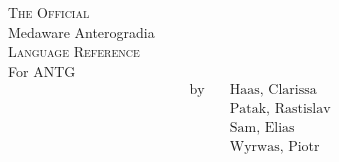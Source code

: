 \vspace*{\fill}
\begin{center}
{\LARGE\textsc{The Official}}
	\\[5mm]
	{\Huge Medaware Anterogradia\texttrademark}\\[5mm]
	{\LARGE\textsc{Language Reference}} \\[10mm]
	\large For ANTG \antgversion \\[2.5mm]
	\normalsize
	\begin{align*}
		\text{by}    \quad    &\text{Haas, Clarissa} \\
		&\text{Patak, Rastislav} \\
		&\text{Sam, Elias} \\
		&\text{Wyrwas, Piotr}
	\end{align*} \\[2.5mm]
\end{center}
\vspace*{\fill}
\newpage
